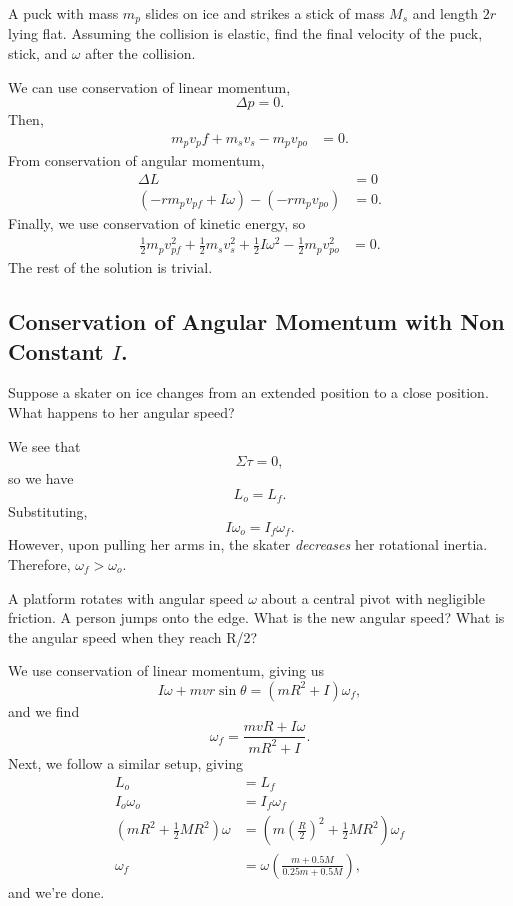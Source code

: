 \documentclass[11pt]{article}
\begin{document}
\begin{example}
	A puck with mass $m_p$ slides on ice and strikes a stick of mass $M_s$ and length $2r$ lying flat. Assuming the collision is elastic, find the final velocity of the puck, stick, and $\omega$ after the collision.
\end{example}
\begin{solution}
	We can use conservation of linear momentum,
	\[\Delta p = 0.\]
	Then,
	\begin{align*}
		m_pv_pf + m_sv_s - m_pv_{po} &= 0.
	\end{align*}
	From conservation of angular momentum,
	\begin{align*}
		\Delta L &= 0  \\
		(-rm_pv_{pf} + I\omega) - (-rm_pv_{po}) &= 0.
	\end{align*}
	Finally, we use conservation of kinetic energy, so
	\begin{align*}
		\frac{1}{2}m_pv_{pf}^2 + \frac{1}{2}m_sv_s^2 + \frac{1}{2}I\omega^2 - \frac{1}{2}m_pv_{po}^2 &= 0.
	\end{align*}
	The rest of the solution is trivial.
\end{solution}

\subsection{Conservation of Angular Momentum with Non Constant $I$.}
Suppose a skater on ice changes from an extended position to a close position. What happens to her angular speed?
\begin{solution}
	We see that\[\Sigma \tau = 0,\]
	so we have \[L_o = L_f.\] Substituting,
	\[I\omega_o = I_f\omega_f.\]
	However, upon pulling her arms in, the skater \textit{decreases} her rotational inertia. Therefore, $\omega_f > \omega_o$.
\end{solution}

\begin{example}
	A platform rotates with angular speed $\omega$ about a central pivot with negligible friction. A person jumps onto the edge. What is the new angular speed? What is the angular speed when they reach R/2?
\end{example}
\begin{solution}
	We use conservation of linear momentum, giving us
	\[I\omega + mvr\sin\theta = (mR^2 + I)\omega_f,\]
	and we find
	\[\omega_f = \boxed{\frac{mvR + I\omega}{mR^2+I}}.\]
	Next, we follow a similar setup, giving
	\begin{align*}
		L_o &= L_f \\
		I_o\omega_o &= I_f\omega_f \\
		(mR^2 + \frac{1}{2}MR^2)\omega &= (m\left(\frac{R}{2}\right)^2 + \frac{1}{2}MR^2)\omega_f \\
		\omega_f &= \boxed{\omega\left(\frac{m + 0.5M}{0.25m+0.5M}\right)},
	\end{align*}
	and we're done.
\end{solution}
\end{document}
